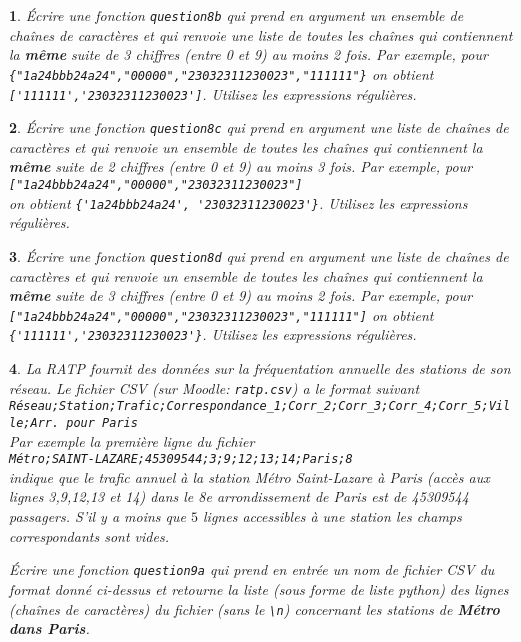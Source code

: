 \documentclass[10pt]{article}
\newtheorem{exi}{}
\newenvironment{exo}{\begin{exi}\em}{\end{exi}}
\begin{document}
\begin{exo}
    Écrire une fonction {\tt question8b} qui prend en argument un ensemble
de chaînes de caractères et qui renvoie une liste de toutes les chaînes
qui contiennent la {\bf même} suite de 3
chiffres (entre 0 et 9) au moins 2 fois.
Par exemple, pour \verb+{"1a24bbb24a24","00000","23032311230023","111111"}+
on obtient \verb+['111111','23032311230023']+.
Utilisez les expressions régulières.
\end{exo}
\vspace*{-2ex}
\begin{exo}
    Écrire une fonction {\tt question8c} qui prend en argument une liste
de chaînes de caractères et qui renvoie un ensemble de toutes les chaînes
qui contiennent la {\bf même} suite de 2
chiffres (entre 0 et 9) au moins 3 fois.
Par exemple, pour \verb+["1a24bbb24a24","00000","23032311230023"]+\\
on obtient \verb+{'1a24bbb24a24', '23032311230023'}+.
Utilisez les expressions régulières.
\end{exo}
\vspace*{-2ex}
\begin{exo}
    Écrire une fonction {\tt question8d} qui prend en argument une liste
de chaînes de caractères et qui renvoie un ensemble de toutes les chaînes
qui contiennent la {\bf même} suite de 3
chiffres (entre 0 et 9) au moins 2 fois.
Par exemple, pour \verb+["1a24bbb24a24","00000","23032311230023","111111"]+
on obtient \verb+{'111111','23032311230023'}+.
Utilisez les expressions régulières.
\end{exo}
\vspace*{-2ex}
\begin{exo}
    La RATP fournit des données sur la fréquentation annuelle des stations de son réseau. Le fichier CSV (sur Moodle: \verb+ratp.csv+) a le format suivant\\
\verb+Réseau;Station;Trafic;Correspondance_1;Corr_2;Corr_3;Corr_4;Corr_5;Ville;Arr. pour Paris+\\
Par exemple la première ligne du fichier\\
\verb+Métro;SAINT-LAZARE;45309544;3;9;12;13;14;Paris;8+\\
indique que le trafic annuel à la station Métro Saint-Lazare à Paris (accès aux lignes 3,9,12,13 et 14) dans le 8e arrondissement de Paris est de 45309544 passagers. S'il y a moins que $5$ lignes accessibles à une station les champs correspondants sont vides.

Écrire une fonction {\tt question9a} qui prend en entrée un nom de fichier CSV
du format donné ci-dessus
et retourne la liste (sous forme de liste python) des lignes (chaînes
de caractères) du fichier (sans le \verb+\n+)
concernant les stations de {\bf Métro dans Paris}.
\end{exo}
\end{document}
